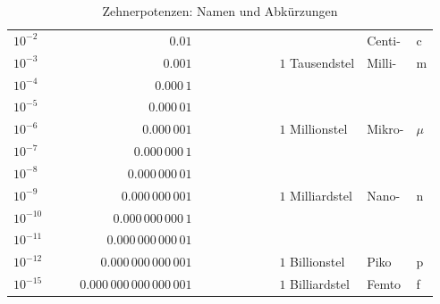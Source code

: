 \documentclass[%
11pt,%
twoside,%
titlepage,%
swissgerman,%
headsepline%
]{scrartcl}
\theoremstyle{definition}
\theoremstyle{plain}
\begin{document}
\begin{table}
\begin{center}
{\begin{tabular}[ht]{lrlll}
    \rule[-3mm]{0mm}{24pt}
    $10^{-2}\quad\quad$ & $0.01$ &  & \hspace*{1cm}Centi- & c\\
    \rule[-3mm]{0mm}{24pt}
    $10^{-3}\quad\quad$ & $0.001$ & $\quad\quad\quad\quad\quad\quad1$ Tausendstel & \hspace*{1cm}Milli- & m\\
    \rule[-3mm]{0mm}{24pt}
    $10^{-4}\quad\quad$ & $0.000\,1$ &  &  & \\
    \rule[-3mm]{0mm}{24pt}
    $10^{-5}\quad\quad$ & $0.000\,01$ &  &  & \\
    \rule[-3mm]{0mm}{24pt}
    $10^{-6}\quad\quad$ & $0.000\,001$ & $\quad\quad\quad\quad\quad\quad1$ Millionstel & \hspace*{1cm}Mikro- & $\mu$\\
    \rule[-3mm]{0mm}{24pt}
    $10^{-7}\quad\quad$ & $0.000\,000\,1$ &  &  & \\
    \rule[-3mm]{0mm}{24pt}
    $10^{-8}\quad\quad$ & $0.000\,000\,01$ &  &  & \\
    \rule[-3mm]{0mm}{24pt}
    $10^{-9}\quad\quad$ & $0.000\,000\,001$ & $\quad\quad\quad\quad\quad\quad1$ Milliardstel & \hspace*{1cm}Nano- & n\\
    \rule[-3mm]{0mm}{24pt}
    $10^{-10}\quad\quad$ & $0.000\,000\,000\,1$ &  &  & \\
    \rule[-3mm]{0mm}{24pt}
    $10^{-11}\quad\quad$ & $0.000\,000\,000\,01$ &  &  & \\
    \rule[-3mm]{0mm}{24pt}
    $10^{-12}\quad\quad$ & $0.000\,000\,000\,001$ & $\quad\quad\quad\quad\quad\quad1$ Billionstel & \hspace*{1cm}Piko & p\\
    \rule[-3mm]{0mm}{24pt}
    $10^{-15}\quad\quad$ & $0.000\,000\,000\,000\,001$ & $\quad\quad\quad\quad\quad\quad1$ Billiardstel & \hspace*{1cm}Femto & f
  \end{tabular}
  }
    \end{center}
    \caption{Zehnerpotenzen: Namen und Abkürzungen}\label{tab:zehnerpotenzen}
 \end{table}
\end{document}
